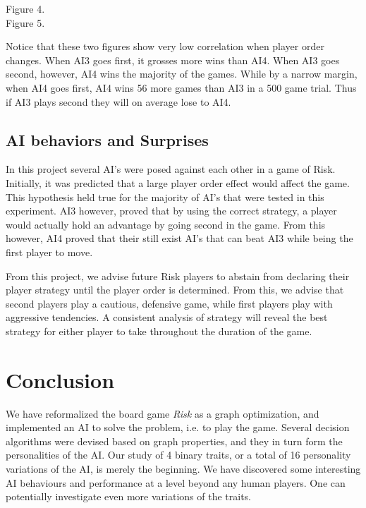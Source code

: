 \documentclass[12pt]{article}  %
\begin{document}
\begin{center}
{\footnotesize Figure 4.}\\
{\footnotesize Figure 5.}
\end{center}

Notice that these two figures show very low correlation when player order changes. When AI3 goes first, it grosses more wins than AI4. When AI3 goes second, however, AI4 wins the majority of the games. While by a narrow margin, when AI4 goes first, AI4 wins 56 more games than AI3 in a 500 game trial. Thus if AI3 plays second they will on average lose to AI4. 


\subsection{AI behaviors and Surprises}
In this project several AI’s were posed against each other in a game of Risk. Initially, it was predicted that a large player order effect would affect the game. This hypothesis held true for the majority of AI’s that were tested in this experiment. AI3 however, proved that by using the correct strategy, a player would actually hold an advantage by going second in the game. From this however, AI4 proved that their still exist AI’s that can beat AI3 while being the first player to move. 

From this project, we advise future Risk players to abstain from declaring their player strategy until the player order is determined. From this, we advise that second players play a cautious, defensive game, while first players play with aggressive tendencies. A consistent analysis of strategy will reveal the best strategy for either player to take throughout the duration of the game. 



\section{Conclusion}
We have reformalized the board game \emph{Risk} as a graph optimization, and implemented an AI to solve the problem, i.e. to play the game. Several decision algorithms were devised based on graph properties, and they in turn form the personalities of the AI. Our study of 4 binary traits, or a total of 16 personality variations of the AI, is merely the beginning. We have discovered some interesting AI behaviours and performance at a level beyond any human players. One can potentially investigate even more variations of the traits.
\end{document}

